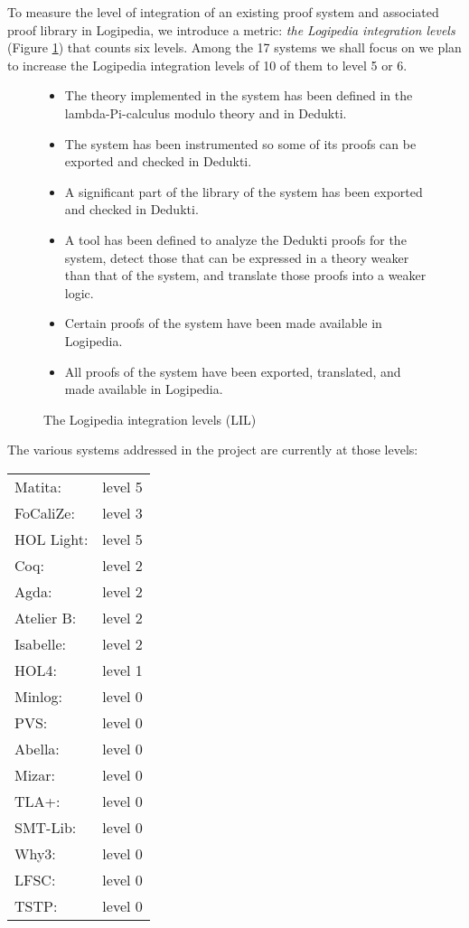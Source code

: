 To measure the level of integration of an existing proof system and
associated proof library in {\sc Logipedia}, we introduce a metric:
{\em the {\sc Logipedia} integration levels} (Figure \ref{lil}) that
counts six levels.  Among the 17 systems we shall focus on we plan to
increase the {\sc Logipedia} integration levels of 10 of them to level
5 or 6.

\begin{figure}
\begin{framed}
  \begin{itemize}
\item[LIL 1:]
The theory implemented in the system has been defined in
the lambda-Pi-calculus modulo theory and in Dedukti.

\item[LIL 2:]
The system has been instrumented so some of its proofs can be exported
and checked in Dedukti.

\item[LIL 3:]
A significant part of the library of the system has been exported and checked in
Dedukti.

\item[LIL 4:]
A tool has been defined to analyze the Dedukti proofs for the system,
detect those that can be expressed in a theory weaker than that of the
system, and translate those proofs into a weaker logic.

\item[LIL 5:]
Certain proofs of the system have been made available in Logipedia.

\item[LIL 6:]
All proofs of the system have been exported, translated,
and made available in Logipedia.
\end{itemize}
\caption{The Logipedia integration levels (LIL)\label{lil}}
\end{framed}
\end{figure}

The various systems addressed in the project are currently at those levels:

\begin{tabular}{ll}
Matita:& level 5\\
FoCaliZe:& level 3\\
HOL Light:& level 5\\
Coq:& level 2\\
Agda:& level 2\\
Atelier B:& level 2\\
Isabelle:& level 2\\
HOL4:& level 1\\
Minlog:& level 0\\
PVS:& level 0\\
Abella:& level 0\\
Mizar:& level 0\\
TLA+:& level 0\\
SMT-Lib:& level 0\\
Why3:& level 0\\
LFSC:& level 0\\
TSTP:& level 0\\
\end{tabular}

